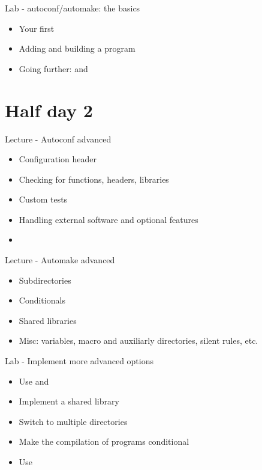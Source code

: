 \documentclass[a4paper,12pt,obeyspaces,spaces,hyphens]{article}
\begin{document}
\feagendaonecolumn
{Lab - autoconf/automake: the basics}
{
  \begin{itemize}
  \item Your first 
  \item Adding and building a program
  \item Going further:  and 
  \end{itemize}
}

\section{Half day 2}

\feagendatwocolumn
{Lecture - Autoconf advanced}
{
  \begin{itemize}
  \item Configuration header
  \item Checking for functions, headers, libraries
  \item Custom tests
  \item Handling external software and optional features
  \item {}
  \end{itemize}
}
{Lecture - Automake advanced}
{
  \begin{itemize}
  \item Subdirectories
  \item Conditionals
  \item Shared libraries
  \item Misc: variables, macro and auxiliarly directories, silent
    rules, etc.
  \end{itemize}
}

\feagendaonecolumn
{Lab - Implement more advanced options}
{
  \begin{itemize}
  \item Use  and 
  \item Implement a shared library
  \item Switch to multiple directories
  \item Make the compilation of programs conditional
  \item Use 
  \end{itemize}
}
\end{document}
